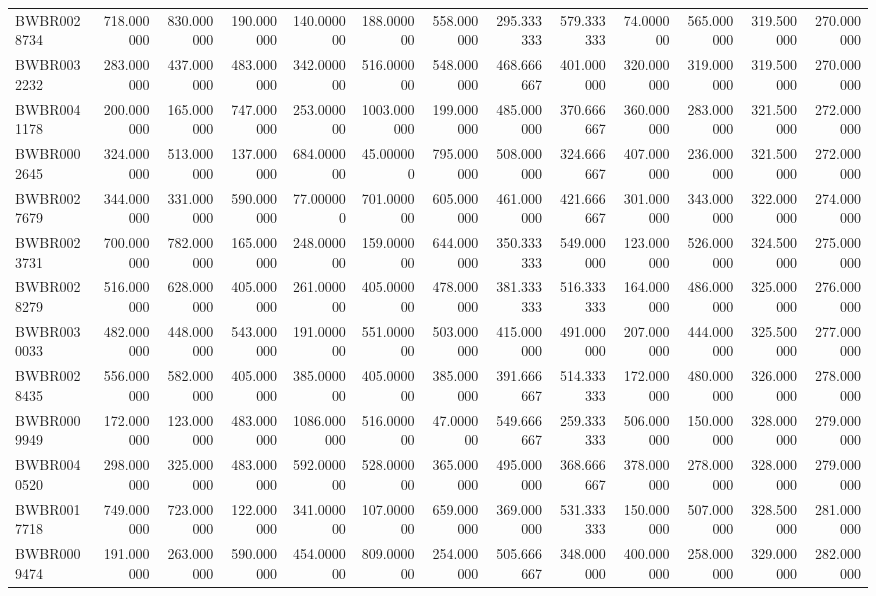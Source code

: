 \begin{longtable}{lrrrrrrrrrrrr}
BWBR0028734 & 718.000000 & 830.000000 & 190.000000 & 140.000000 & 188.000000 & 558.000000 & 295.333333 & 579.333333 & 74.000000 & 565.000000 & 319.500000 & 270.000000 \\
BWBR0032232 & 283.000000 & 437.000000 & 483.000000 & 342.000000 & 516.000000 & 548.000000 & 468.666667 & 401.000000 & 320.000000 & 319.000000 & 319.500000 & 270.000000 \\
BWBR0041178 & 200.000000 & 165.000000 & 747.000000 & 253.000000 & 1003.000000 & 199.000000 & 485.000000 & 370.666667 & 360.000000 & 283.000000 & 321.500000 & 272.000000 \\
BWBR0002645 & 324.000000 & 513.000000 & 137.000000 & 684.000000 & 45.000000 & 795.000000 & 508.000000 & 324.666667 & 407.000000 & 236.000000 & 321.500000 & 272.000000 \\
BWBR0027679 & 344.000000 & 331.000000 & 590.000000 & 77.000000 & 701.000000 & 605.000000 & 461.000000 & 421.666667 & 301.000000 & 343.000000 & 322.000000 & 274.000000 \\
BWBR0023731 & 700.000000 & 782.000000 & 165.000000 & 248.000000 & 159.000000 & 644.000000 & 350.333333 & 549.000000 & 123.000000 & 526.000000 & 324.500000 & 275.000000 \\
BWBR0028279 & 516.000000 & 628.000000 & 405.000000 & 261.000000 & 405.000000 & 478.000000 & 381.333333 & 516.333333 & 164.000000 & 486.000000 & 325.000000 & 276.000000 \\
BWBR0030033 & 482.000000 & 448.000000 & 543.000000 & 191.000000 & 551.000000 & 503.000000 & 415.000000 & 491.000000 & 207.000000 & 444.000000 & 325.500000 & 277.000000 \\
BWBR0028435 & 556.000000 & 582.000000 & 405.000000 & 385.000000 & 405.000000 & 385.000000 & 391.666667 & 514.333333 & 172.000000 & 480.000000 & 326.000000 & 278.000000 \\
BWBR0009949 & 172.000000 & 123.000000 & 483.000000 & 1086.000000 & 516.000000 & 47.000000 & 549.666667 & 259.333333 & 506.000000 & 150.000000 & 328.000000 & 279.000000 \\
BWBR0040520 & 298.000000 & 325.000000 & 483.000000 & 592.000000 & 528.000000 & 365.000000 & 495.000000 & 368.666667 & 378.000000 & 278.000000 & 328.000000 & 279.000000 \\
BWBR0017718 & 749.000000 & 723.000000 & 122.000000 & 341.000000 & 107.000000 & 659.000000 & 369.000000 & 531.333333 & 150.000000 & 507.000000 & 328.500000 & 281.000000 \\
BWBR0009474 & 191.000000 & 263.000000 & 590.000000 & 454.000000 & 809.000000 & 254.000000 & 505.666667 & 348.000000 & 400.000000 & 258.000000 & 329.000000 & 282.000000 \\

\end{longtable}
